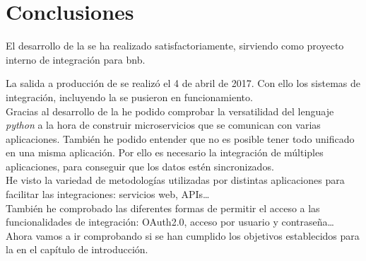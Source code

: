 \chapter{Conclusiones}

El desarrollo de la \iface{} se ha realizado satisfactoriamente, sirviendo como proyecto interno de integración para \acrshort{bnb}.

La salida a producción de \wday{} se realizó el 4 de abril de 2017. Con ello los sistemas de integración, incluyendo la \iface{} se pusieron en funcionamiento.\\



Gracias al desarrollo de la \iface{} he podido comprobar la versatilidad del lenguaje \textit{python} a la hora de construir microservicios que se comunican con varias aplicaciones.
También he podido entender que no es posible tener todo unificado en una misma aplicación. Por ello es necesario la integración de múltiples aplicaciones, para conseguir que los datos estén sincronizados.\\

He visto la variedad de metodologías utilizadas por distintas aplicaciones para facilitar las integraciones: servicios web, APIs\ldots\\

También he comprobado las diferentes formas de permitir el acceso a las funcionalidades de integración: OAuth2.0, acceso por usuario y contraseña\ldots\\





Ahora vamos a ir comprobando si se han cumplido los objetivos establecidos para la \iface{} en el capítulo de introducción.

